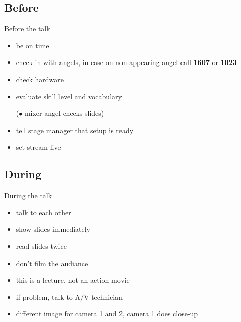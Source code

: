 \documentclass[hyperref={pdfpagelabels=false},aspectratio=169]{beamer}
\begin{document}
\subsection{Before}
\begin{frame}{Before the talk}
\begin{itemize} %
\item be on time %
\item check in with angels, in case on non-appearing angel call \textbf{1607} or \textbf{1023} %
\item check hardware %
\item evaluate skill level and vocabulary %
\item [($\bullet$] mixer angel checks slides) %
\item tell stage manager that setup is ready
\item set stream live %
\end{itemize} 
\end{frame}

\subsection{During} %
\begin{frame}{During the talk}
\begin{itemize}
\item talk to each other %
\item show slides immediately
\item read slides twice
\item don't film the audiance
\item this is a lecture, not an action-movie 
\item if problem, talk to A/V-technician
\item different image for camera 1 and 2, camera 1 does close-up
\end{itemize} 
\end{frame}
\end{document}
